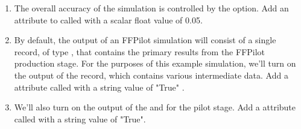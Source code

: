 \begin{enumerate}
\begin{enumerate}
        \begin{enumerate}
            \item The overall accuracy of the simulation is controlled by the  option. Add an attribute to  called  with a scalar float value of 0.05.
            \item By default, the output of an FFPilot simulation will consist of a single record, of type , that contains the primary results from the FFPilot production stage. For the purposes of this example simulation, we'll turn on the output of the  record, which contains various intermediate data. Add a  attribute called  with a string value of "True" .
            \item We'll also turn on the output of the  and  for the pilot stage. Add a  attribute called  with a string value of "True".
        \end{enumerate}
    \end{enumerate}
\end{enumerate}
